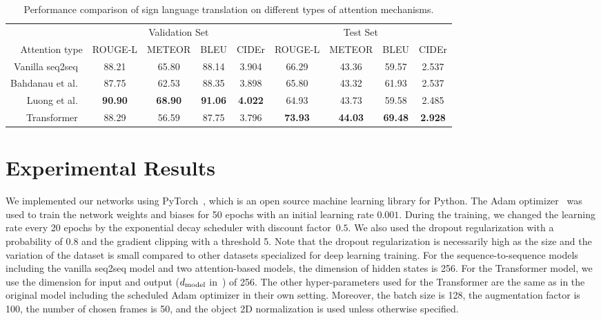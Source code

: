 \documentclass[10pt,twocolumn,letterpaper]{article}
\begin{document}
\begin{table*}
\centering
\begin{tabular}{@{ }rcccccccc@{ }}
\toprule
& \multicolumn{4}{c}{Validation Set} & \multicolumn{4}{c}{Test Set} \\
\cmidrule(lr){2-5} \cmidrule(lr){6-9}
Attention type    &   ROUGE-L & METEOR  & BLEU  & CIDEr &  ROUGE-L & METEOR  & BLEU & CIDEr\\
\midrule
Vanilla seq2seq~\cite{SutskeverVL14} & 88.21 & 65.80 & 88.14 & 3.904 & 66.29 & 43.36 & 59.57 & 2.537\\
Bahdanau et al.~\cite{BahdanauCB14} & 87.75 & 62.53 & 88.35 & 3.898 & 65.80 & 43.32 & 61.93 & 2.537\\
Luong et al.~\cite{LuongPM15} & \textbf{90.90} & \textbf{68.90} & \textbf{91.06} & \textbf{4.022} & 64.93 & 43.73 & 59.58 & 2.485 \\
Transformer~\cite{VaswaniSPUJGKP17} & 88.29 & 56.59 & 87.75 & 3.796 & \textbf{73.93} & \textbf{44.03} & \textbf{69.48} & \textbf{2.928} \\
\bottomrule
\end{tabular}
\caption{Performance comparison of sign language translation on different types of attention mechanisms.}
\label{tab:attention}
\end{table*}

\section{Experimental Results}

We implemented our networks using PyTorch~\cite{PaszkeGCCYDLDAL17}, which is an open source machine learning library for Python.
The Adam optimizer~\cite{KingmaB14} was used to train the network weights and biases for 50 epochs with an initial learning rate $0.001$. During the training, we changed the learning rate every 20 epochs by the exponential decay scheduler with discount factor~$0.5$. We also used the dropout regularization with a probability of 0.8 and the gradient clipping with a threshold 5. Note that the dropout regularization is necessarily high as the size and the variation of the dataset is small compared to other datasets specialized for deep learning training. For the sequence-to-sequence models including the vanilla seq2seq model and two attention-based models, the dimension of hidden states is 256. For the Transformer model, we use the dimension for input and output ($d_{\rm model}$ in~\cite{VaswaniSPUJGKP17}) of 256. The other hyper-parameters used for the Transformer are the same as in the original model including the scheduled Adam optimizer in their own setting. Moreover, the batch size is 128, the augmentation factor is 100, the number of chosen frames is 50, and the object 2D normalization is used unless otherwise specified.
\end{document}
